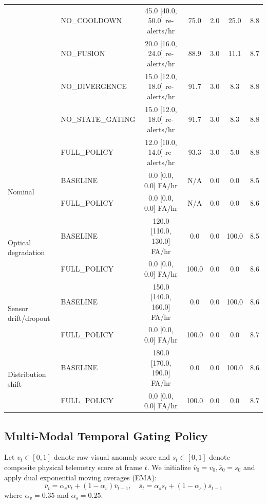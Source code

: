 \documentclass[conference]{IEEEtran}
\begin{document}
\begin{table}[!t]
{\begin{tabular}{llccccc}
        & NO\_COOLDOWN & 45.0 [40.0, 50.0] re-alerts/hr & 75.0 & 2.0 & 25.0 & 8.8 \\
        & NO\_FUSION & 20.0 [16.0, 24.0] re-alerts/hr & 88.9 & 3.0 & 11.1 & 8.7 \\
        & NO\_DIVERGENCE & 15.0 [12.0, 18.0] re-alerts/hr & 91.7 & 3.0 & 8.3 & 8.8 \\
        & NO\_STATE\_GATING & 15.0 [12.0, 18.0] re-alerts/hr & 91.7 & 3.0 & 8.3 & 8.8 \\
        & FULL\_POLICY & 12.0 [10.0, 14.0] re-alerts/hr & 93.3 & 3.0 & 5.0 & 8.8 \\
        \midrule
        \multirow{2}{*}{Nominal}
        & BASELINE & 0.0 [0.0, 0.0] FA/hr & N/A & 0.0 & 0.0 & 8.5 \\
        & FULL\_POLICY & 0.0 [0.0, 0.0] FA/hr & N/A & 0.0 & 0.0 & 8.6 \\
        \midrule
        \multirow{2}{*}{Optical degradation}
        & BASELINE & 120.0 [110.0, 130.0] FA/hr & 0.0 & 0.0 & 100.0 & 8.5 \\
        & FULL\_POLICY & 0.0 [0.0, 0.0] FA/hr & 100.0 & 0.0 & 0.0 & 8.6 \\
        \midrule
        \multirow{2}{*}{Sensor drift/dropout}
        & BASELINE & 150.0 [140.0, 160.0] FA/hr & 0.0 & 0.0 & 100.0 & 8.6 \\
        & FULL\_POLICY & 0.0 [0.0, 0.0] FA/hr & 100.0 & 0.0 & 0.0 & 8.7 \\
        \midrule
        \multirow{2}{*}{Distribution shift}
        & BASELINE & 180.0 [170.0, 190.0] FA/hr & 0.0 & 0.0 & 100.0 & 8.6 \\
        & FULL\_POLICY & 0.0 [0.0, 0.0] FA/hr & 100.0 & 0.0 & 0.0 & 8.7 \\
        \bottomrule
    \end{tabular}%
    }
\end{table}

\subsection{Multi-Modal Temporal Gating Policy}
Let $v_t \in [0, 1]$ denote raw visual anomaly score and $s_t \in [0, 1]$ denote composite physical telemetry score at frame $t$. We initialize $\bar{v}_0 = v_0, \bar{s}_0 = s_0$ and apply dual exponential moving averages (EMA):
\begin{equation}
\bar{v}_t = \alpha_v v_t + (1 - \alpha_v) \bar{v}_{t-1}, \quad \bar{s}_t = \alpha_s s_t + (1 - \alpha_s) \bar{s}_{t-1}
\end{equation}
where $\alpha_v = 0.35$ and $\alpha_s = 0.25$.
\end{document}
